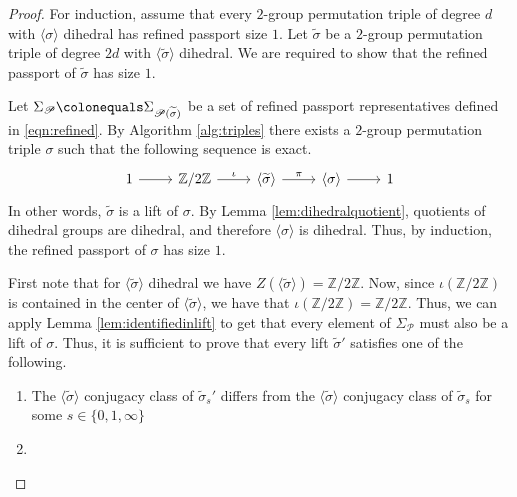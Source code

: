 \documentclass{dcthesis}
\newcommand{\ZZ}{\mathbb Z}
\newcommand{\wt}[1]{\widetilde{#1}}
\numberwithin{equation}{section}
\theoremstyle{definition}
\theoremstyle{remark}
\begin{document}
{{{\begin{proof}
      For induction,
      assume that every $2$-group
      permutation triple
      of degree $d$
      with $\langle\sigma\rangle$ dihedral
      has refined passport size $1$.
      Let $\wt{\sigma}$ be a $2$-group
      permutation triple of degree
      $2d$ with $\langle\wt{\sigma}\rangle$
      dihedral.
      We are required to show that the refined
      passport of $\wt{\sigma}$ has size $1$.
      \par
      Let $\Sigma_\mathscr{P}\colonequals
      \Sigma_{\mathscr{P}(\wt{\sigma})}$
      be a set of refined
      passport representatives defined in
      \eqref{eqn:refined}.
      By Algorithm \ref{alg:triples}
      there exists a $2$-group permutation triple
      $\sigma$ such that the
      following sequence is exact.
      \begin{equation}
        \label{eqn:sigmasequence}
        \begin{tikzcd}
          1\arrow{r}&\ZZ/2\ZZ\arrow{r}{\iota}
                    &\langle\wt{\sigma}\rangle\arrow{r}{\pi}
                    &\langle\sigma\rangle\arrow{r}
                    &1
        \end{tikzcd}
      \end{equation}
      In other words,
      $\wt{\sigma}$ is a lift of $\sigma$.
      By Lemma
      \ref{lem:dihedralquotient},
      quotients of dihedral groups are
      dihedral,
      and therefore
      $\langle\sigma\rangle$ is dihedral.
      Thus, by induction,
      the refined passport of $\sigma$
      has size $1$.
      \par
      First note that
      for $\langle\wt{\sigma}\rangle$
      dihedral we have
      $Z(\langle\wt{\sigma}\rangle)
      =\ZZ/2\ZZ$.
      Now, since $\iota(\ZZ/2\ZZ)$ is contained
      in the center of
      $\langle\wt{\sigma}\rangle$,
      we have that
      $\iota(\ZZ/2\ZZ) = \ZZ/2\ZZ$.
      Thus, we can apply
      Lemma \ref{lem:identifiedinlift}
      to get that
      every element of $\Sigma_\mathscr{P}$
      must also be a lift of $\sigma$.
      Thus, it is sufficient to prove that every
      lift $\wt{\sigma}'$ satisfies one
      of the following.
      \begin{enumerate}
        \item\label{itm:distinctconjclasses}
          The $\langle\wt{\sigma}\rangle$
          conjugacy class of
          $\wt{\sigma}_s'$ differs from
          the $\langle\wt{\sigma}\rangle$
          conjugacy class of
          $\wt{\sigma}_s$ for
          some $s\in \{0,1,\infty\}$
        \item\label{itm:thereexistsanauto}

\end{enumerate}
\end{proof}}}}
\end{document}
